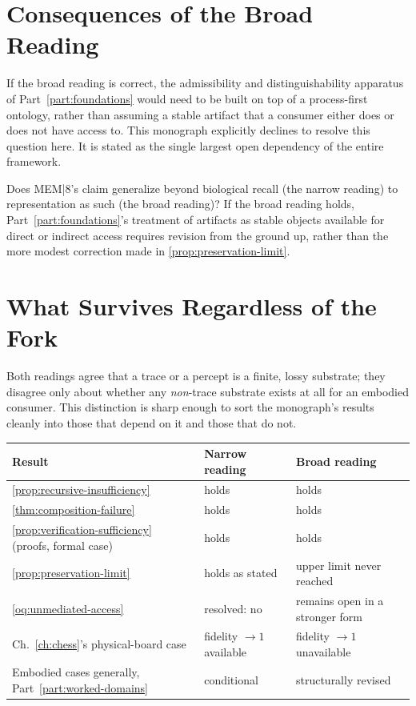 \section{Consequences of the Broad Reading}

If the broad reading is correct, the admissibility and distinguishability
apparatus of Part~\ref{part:foundations} would need to be built on top of
a process-first ontology, rather than assuming a stable artifact that a
consumer either does or does not have access to. This monograph
explicitly declines to resolve this question here. It is stated as the
single largest open dependency of the entire framework.

\begin{openquestion}
\label{oq:mem8-fork}
Does MEM|8's claim generalize beyond biological recall (the narrow
reading) to representation as such (the broad reading)? If the broad
reading holds, Part~\ref{part:foundations}'s treatment of artifacts as
stable objects available for direct or indirect access requires revision
from the ground up, rather than the more modest correction made in
\cref{prop:preservation-limit}.
\end{openquestion}

\section{What Survives Regardless of the Fork}

Both readings agree that a trace or a percept is a finite, lossy
substrate; they disagree only about whether any \emph{non}-trace
substrate exists at all for an embodied consumer. This distinction is
sharp enough to sort the monograph's results cleanly into those that
depend on it and those that do not.

\begin{center}
\begin{tabular}{lll}
\toprule
Result & Narrow reading & Broad reading \\
\midrule
\cref{prop:recursive-insufficiency} & holds & holds \\
\cref{thm:composition-failure} & holds & holds \\
\cref{prop:verification-sufficiency} (proofs, formal case) & holds & holds \\
\cref{prop:preservation-limit} & holds as stated & upper limit never reached \\
\cref{oq:unmediated-access} & resolved: no & remains open in a stronger form \\
Ch.~\ref{ch:chess}'s physical-board case & fidelity $\to 1$ available & fidelity $\to 1$ unavailable \\
Embodied cases generally, Part~\ref{part:worked-domains} & conditional & structurally revised \\
\bottomrule
\end{tabular}
\end{center}

